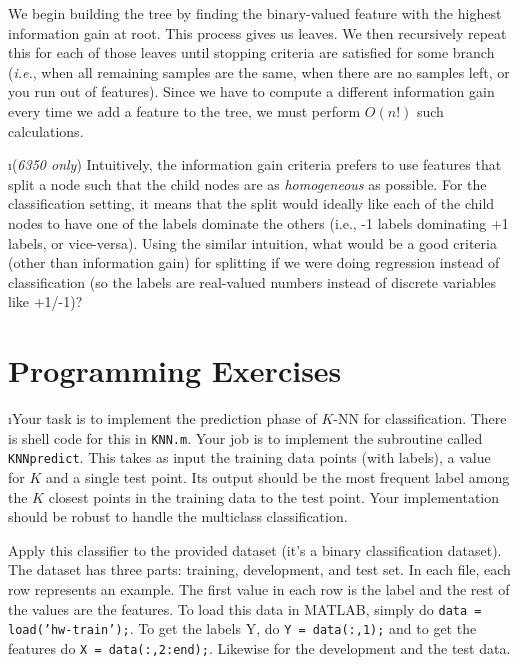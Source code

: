 \documentclass[fleqn]{article}
\begin{document}
\begin{solution}
We begin building the tree by finding the binary-valued feature with the highest information gain at root. This process gives us leaves. We then recursively repeat this for each of those leaves until stopping criteria are satisfied for some branch (\textit{i.e.}, when all remaining samples are the same, when there are no samples left, or you run out of features). Since we have to compute a different information gain every time we add a feature to the tree, we must perform $O(n!)$ such calculations.
\end{solution}

\i (\textit{6350 only}) Intuitively, the information gain criteria prefers to use 
features that split a node such that the child nodes are as \textit{homogeneous} 
as possible. For the classification setting, it means that the split would ideally 
like each of the child nodes to have one of the labels dominate the others (i.e., 
-1 labels dominating +1 labels, or vice-versa). Using the similar intuition, what 
would be a good criteria (other than information gain) for splitting if we were 
doing regression instead of classification (so the labels are real-valued numbers 
instead of discrete variables like +1/-1)?

\ene

\section{Programming Exercises}

\bee

\i Your task is to implement the prediction phase of $K$-NN for classification. 
There is shell code for this in \texttt{KNN.m}. Your job is to implement the 
subroutine called \texttt{KNNpredict}. This takes as input the training data 
points (with labels), a value for $K$ and a single test point. Its output 
should be the most frequent label among the $K$ closest points in the training 
data to the test point. Your implementation should be robust to handle the 
multiclass classification.

Apply this classifier to the provided dataset (it's a binary classification dataset). 
The dataset has three parts: training, development, and test set. In each file, each
row represents an example. The first value in each row is the label and the rest of the 
values are the features. To load this data in MATLAB, simply do \texttt{data = 
load('hw-train');}. To get the labels Y, do \texttt{Y = data(:,1);} and to get the 
features do \texttt{X = data(:,2:end);}. Likewise for the development and the test data.
\end{document}
